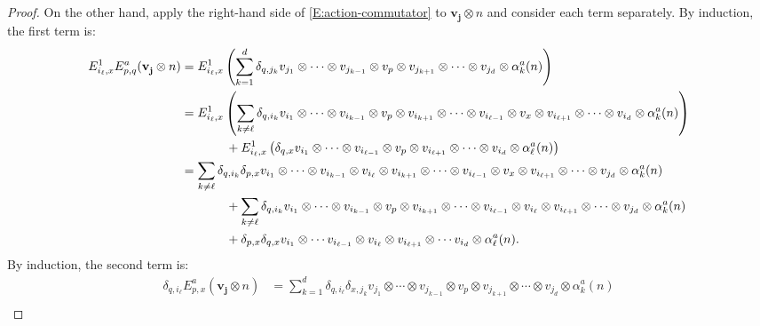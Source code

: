 \documentclass[11pt,reqno]{amsart} %
\newcommand{\0}{\bar{0}}
\newcommand{\1}{\bar{1}}
\newcommand{\bv}{\mathbf{v}}
\newcommand{\bj}{\mathbf{j}}
\numberwithin{equation}{subsection}
\begin{document}
\begin{proof}
On the other hand, apply the right-hand side of \eqref{E:action-commutator} to $\bv^{}_{\bj} \otimes n$ and consider each term separately.  By induction, the first term is:
\begin{align*}
E^{1}_{i_{\ell}, x} E^{a}_{p,q} (\bv^{}_{\bj}\otimes n) &=E^{1}_{i_{\ell}, x} \left(  \sum_{k=1}^{d} \delta_{q, j_{k}} v_{j_{1}} \otimes \dotsb \otimes  v_{j_{k-1}}\otimes v_{p} \otimes v_{j_{k+1}} \otimes  \dotsb \otimes v_{j_{d}}  \otimes \alpha_{k}^{a}(n)\right) \\
&=E^{1}_{i_{\ell}, x} \left(  \sum_{k\neq \ell} \delta_{q, i_{k}} v_{i_{1}} \otimes \dotsb \otimes v_{i_{k-1}} \otimes v_{p} \otimes v_{i_{k+1}} \otimes \dotsb \otimes v_{i_{\ell-1}}\otimes  v_{x} \otimes v_{i_{\ell+1}}\otimes  \dotsb \otimes v_{i_{d}}  \otimes \alpha_{k}^{a}(n) \right) \\
 &\hspace{0.5in} + E^{1}_{i_{\ell}, x} \left( \delta_{q,x} v_{i_{1}}\otimes \dotsb \otimes v_{i_{\ell-1}} \otimes v_{p} \otimes v_{i_{\ell+1}} \otimes \dotsb \otimes  v_{i_{d}} \otimes \alpha_{\ell}^{a}(n)\right) \\
&=  \sum_{k\neq \ell} \delta_{q, i_{k}}\delta_{p,x} v_{i_{1}} \otimes \dotsb \otimes v_{i_{k-1}}\otimes  v_{i_{\ell}} \otimes v_{i_{k+1}} \otimes \dotsb \otimes v_{i_{\ell-1}}\otimes  v_{x} \otimes v_{i_{\ell+1}}\otimes  \dotsb \otimes v_{j_{d}}  \otimes \alpha_{k}^{a}(n)  \\
 &\hspace{0.5in}  + \sum_{k\neq \ell} \delta_{q, i_{k}} v_{i_{1}} \otimes \dotsb\otimes v_{i_{k-1}} \otimes v_{p} \otimes v_{i_{k+1}}\otimes  \dotsb \otimes v_{i_{\ell-1}}\otimes  v_{i_{\ell}} \otimes v_{i_{\ell+1}}\otimes  \dotsb \otimes v_{j_{d}}  \otimes \alpha_{k}^{a}(n) \\
 &\hspace{0.5in}   +  \delta_{p,x} \delta_{q,x} v_{i_{1}}\otimes \dotsb v_{i_{\ell-1}} \otimes v_{i_{\ell}} \otimes v_{i_{\ell+1}} \otimes \dotsb v_{i_{d}} \otimes  \alpha_{\ell}^{a}(n).
\end{align*}  By induction, the second term is:
\begin{align*}
\delta_{q, i_{\ell}} E^{a}_{p,x}(\bv^{}_{\bj}\otimes n) &=   \sum_{k=1}^{d} \delta_{q, i_{\ell}} \delta_{x,j_{k}}v_{j_{1}} \otimes \dotsb \otimes v_{j_{k-1}} \otimes v_{p} \otimes v_{j_{k+1}} \otimes  \dotsb \otimes v_{j_{d}}  \otimes \alpha_{k}^{a}(n) \\

\end{align*}
\end{proof}
\end{document}
